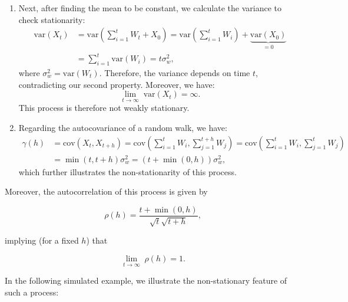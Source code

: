 \documentclass[]{book}
\theoremstyle{definition}
\theoremstyle{definition}
\theoremstyle{definition}
\theoremstyle{remark}
\begin{document}
\begin{enumerate}
\def\labelenumi{\arabic{enumi}.}
\setcounter{enumi}{1}
\item
  Next, after finding the mean to be constant, we calculate the variance
  to check stationarity: \[\begin{aligned}
    \text{var}\left( {{X_t}} \right) &= \text{var}\left( {\sum\limits_{i = 1}^t {{W_t}}  + {X_0}} \right) 
    = \text{var}\left( {\sum\limits_{i = 1}^t {{W_i}} } \right) + \underbrace {\text{var}\left( {{X_0}} \right)}_{= 0} \\
    &= \sum\limits_{i = 1}^t {\text{var}\left( {{W_i}} \right)} 
    = t \sigma_w^2,
    \end{aligned}\] where \(\sigma_w^2 = \text{var}(W_t)\). Therefore,
  the variance depends on time \(t\), contradicting our second property.
  Moreover, we have:
  \[\mathop {\lim }\limits_{t \to \infty } \; \text{var}\left(X_t\right) = \infty.\]
  This process is therefore not weakly stationary.
\item
  Regarding the autocovariance of a random walk, we have:
  \[\begin{aligned}
    \gamma \left( h \right) &= \text{cov}\left( {{X_t},{X_{t + h}}} \right) 
    = \text{cov}\left( {\sum\limits_{i = 1}^t {{W_i}} ,\sum\limits_{j = 1}^{t + h} {{W_j}} } \right) 
    = \text{cov}\left( {\sum\limits_{i = 1}^t {{W_i}} ,\sum\limits_{j = 1}^t {{W_j}} } \right)\\ 
    &= \min \left( {t,t + h} \right)\sigma _w^2
    = \left( {t + \min \left( {0,h} \right)} \right)\sigma _w^2,
    \end{aligned} \] which further illustrates the non-stationarity of
  this process.
\end{enumerate}

Moreover, the autocorrelation of this process is given by

\[\rho (h) = \frac{t + \min \left( {0,h} \right)}{\sqrt{t}\sqrt{t+h}},\]

implying (for a fixed \(h\)) that

\[\mathop {\lim }\limits_{t \to \infty } \; \rho(h) = 1.\]

In the following simulated example, we illustrate the non-stationary
feature of such a process:
\end{document}
